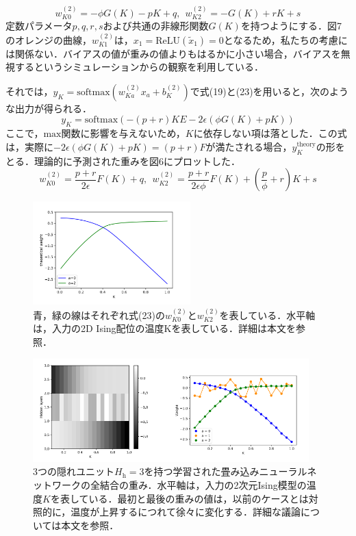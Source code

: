 \documentclass[a4paper,11pt]{jsarticle}
\begin{document}
\begin{equation}
  w_{K0}^{(2)} = -\phi G(K) - pK + q, \ \
  w_{K2}^{(2)} = -G(K) + rK + s
\end{equation}
定数パラメータ$p,q,r,s$および共通の非線形関数$G(K)$を持つようにする．図7のオレンジの曲線，$w^{(2)}_{K1}$は，$x_1 = \text{ReLU}(\tilde{x}_1) = 0$となるため，私たちの考慮には関係ない．バイアスの値が重みの値よりもはるかに小さい場合，バイアスを無視するというシミュレーションからの観察を利用している．\par
それでは，$y_K = \text{softmax}(w_{Ka}^{(2)}x_a + b_K^{(2)})$で式(19)と(23)を用いると，次のような出力が得られる．
\begin{equation}
  y_K = \text{softmax}(-(p+r)KE - 2\epsilon(\phi G(K) + pK))
\end{equation}
ここで，$\text{max}$関数に影響を与えないため，$K$に依存しない項は落とした．この式は，実際に$-2\epsilon (\phi G(K) + pK) = (p + r)F$が満たされる場合，$y_K^{\text{theory}}$の形をとる．理論的に予測された重みを図6にプロットした．
\begin{equation}
  w_{K0}^{(2)} = \frac{p+r}{2\epsilon}F(K) + q, \ \
  w_{K2}^{(2)} = \frac{p+r}{2\epsilon \phi}F(K) + \left( \frac{p}{\phi} + r \right)K + s
\end{equation}
\begin{figure}
  \begin{center}
    \includegraphics[height=4cm]{image/Figure6.png}
    \caption{青，緑の線はそれぞれ式(23)の$w_{K0}^{(2)}$と$w_{K2}^{(2)}$を表している．水平軸は，入力の2D Ising配位の温度Kを表している．詳細は本文を参照．}
  \end{center}
\end{figure}
\begin{figure}
  \begin{center}
    \includegraphics[height=4cm]{image/Figure7.png}
    \caption{3つの隠れユニット$H_{\text{h}}=3$を持つ学習された畳み込みニューラルネットワークの全結合の重み．水平軸は，入力の2次元Ising模型の温度$K$を表している．最初と最後の重みの値は，以前のケースとは対照的に，温度が上昇するにつれて徐々に変化する．詳細な議論については本文を参照．}
  \end{center}
\end{figure}
\end{document}
